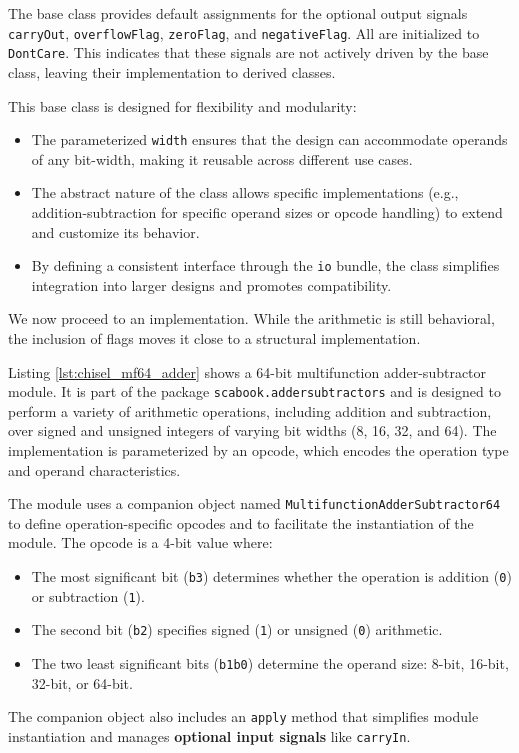 {The base class provides default assignments for the optional output signals \texttt{carryOut}, \texttt{overflowFlag}, \texttt{zeroFlag}, and \texttt{negativeFlag}. All are initialized to \texttt{DontCare}. This indicates that these signals are not actively driven by the base class, leaving their implementation to derived classes.

This base class is designed for flexibility and modularity:
\begin{itemize}
    \item The parameterized \texttt{width} ensures that the design can accommodate operands of any bit-width, making it reusable across different use cases.
    \item The abstract nature of the class allows specific implementations (e.g., addition-subtraction for specific operand sizes or opcode handling) to extend and customize its behavior.
    \item By defining a consistent interface through the \texttt{io} bundle, the class simplifies integration into larger designs and promotes compatibility.
\end{itemize}

We now proceed to an implementation. While the arithmetic is still behavioral, the inclusion of flags moves it close to a structural implementation.


Listing \ref{lst:chisel_mf64_adder} shows a 64-bit multifunction adder-subtractor module. It is part of the package \texttt{scabook.addersubtractors} and is designed to perform a variety of arithmetic operations, including addition and subtraction, over signed and unsigned integers of varying bit widths (8, 16, 32, and 64). The implementation is parameterized by an opcode, which encodes the operation type and operand characteristics. 

The module uses a companion object named \texttt{MultifunctionAdderSubtractor64} to define operation-specific opcodes and to facilitate the instantiation of the module. The opcode is a 4-bit value where:
\begin{itemize}
    \item The most significant bit (\texttt{b3}) determines whether the operation is addition (\texttt{0}) or subtraction (\texttt{1}).
    \item The second bit (\texttt{b2}) specifies signed (\texttt{1}) or unsigned (\texttt{0}) arithmetic.
    \item The two least significant bits (\texttt{b1b0}) determine the operand size: 8-bit, 16-bit, 32-bit, or 64-bit.
\end{itemize}
The companion object also includes an \texttt{apply} method that simplifies module instantiation and manages \textbf{optional input signals} like \texttt{carryIn}.

}
